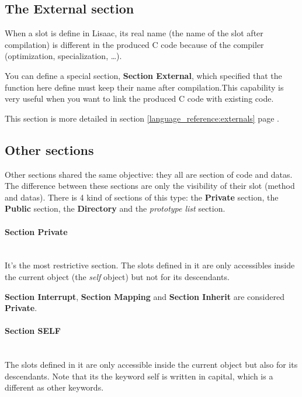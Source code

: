 \documentclass[11pt]{mybook}
\begin{document}
\subsection{The External section }
\label{language_reference:section_identifiers:external_section}
When a slot is define in Lisaac, its real name (the name of the slot after compilation) is different in the produced C code because of the compiler (optimization, specialization, \ldots).

You can define a special section, {\bf{}Section External}, which specified that the function here define must keep their name after compilation.This capability is very useful when you want to link the produced C code with existing code.

This section is more detailed in section {\ref{language_reference:externals} page \pageref{language_reference:externals}}.

\subsection{Other sections}
\label{language_reference:section_identifiers:other_section}
%
Other sections shared the same objective: they all are section of code and datas.
The difference between these sections are only the visibility of their slot (method and datas).
There is 4 kind of sections of this type:
the {\bf{}Private} section, the {\bf{}Public} section, the {\bf{}Directory} and the {\it{}prototype list} section.
\paragraph{{\bf{}Section Private}}  
~\\
It's the most restrictive section. The slots defined in it are only accessibles inside the current object (the {\it{}self} object) but not for its descendants.

{\bf{}Section Interrupt}, {\bf{}Section Mapping} and {\bf{}Section Inherit} are considered {\bf{}Private}.

\paragraph{{\bf{}Section SELF}}  
~\\
The slots defined in it are only accessible inside the current object but also for its descendants. Note that its the keyword {\sc{}self} is written in capital, which is a different as other keywords.
\end{document}
